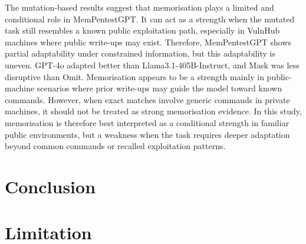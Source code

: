 \documentclass[acmtog]{acmart}
\begin{document}
The mutation-based results suggest that memorisation plays a limited and conditional role in MemPentestGPT. It can act as a strength when the mutated task still resembles a known public exploitation path, especially in VulnHub machines where public write-ups may exist. Therefore, MemPentestGPT shows partial adaptability under constrained information, but this adaptability is uneven. GPT-4o adapted better than Llama3.1-405B-Instruct, and Mask was less disruptive than Omit. Memorisation appears to be a strength mainly in public-machine scenarios where prior write-ups may guide the model toward known commands. However, when exact matches involve generic commands in private machines, it should not be treated as strong memorisation evidence. In this study, memorisation is therefore best interpreted as a conditional strength in familiar public environments, but a weakness when the task requires deeper adaptation beyond common commands or recalled exploitation patterns.

\section{Conclusion}


\section{Limitation}
\end{document}
